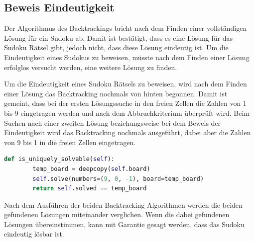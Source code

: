\subsection{Beweis Eindeutigkeit}
Der Algorithmus des Backtrackings bricht nach dem Finden einer vollständigen Lösung für ein Sudoku ab. Damit ist bestätigt, dass es eine Lösung für das Sudoku Rätsel gibt, jedoch nicht, dass diese Lösung eindeutig ist. Um die Eindeutigkeit eines Sudokus zu beweisen, müsste nach dem Finden einer Lösung erfolglos versucht werden, eine weitere Lösung zu finden.

Um die Eindeutigkeit eines Sudoku Rätsels zu beweisen, wird nach dem Finden einer Lösung das Backtracking nochmals von hinten begonnen. Damit ist gemeint, dass bei der ersten Lösungssuche in den freien Zellen die Zahlen von 1 bis 9 eingetragen werden und nach dem Abbruchkriterium überprüft wird. Beim Suchen nach einer zweiten Lösung beziehungsweise bei dem Beweis der Eindeutigkeit wird das Backtracking nochmals ausgeführt, dabei aber die Zahlen von 9 bis 1 in die freien Zellen eingetragen.

\begin{lstlisting}[language=Python, caption={Überprüfen ob ein Sudoku Rätsel eine eindeutige Lösung hat}, label={lst:uniquesolve}]
	def is_uniquely_solvable(self):
		temp_board = deepcopy(self.board)
		self.solve(numbers=(9, 0, -1), board=temp_board)
		return self.solved == temp_board
\end{lstlisting}

Nach dem Ausführen der beiden Backtracking Algorithmen werden die beiden gefundenen Lösungen miteinander verglichen. Wenn die dabei gefundenen Lösungen übereinstimmen, kann mit Garantie gesagt werden, dass das Sudoku eindeutig lösbar ist.

